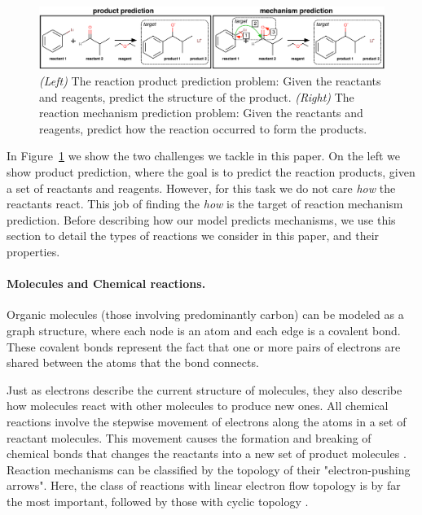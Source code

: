 

\begin{figure}[t!]
\centering
\includegraphics[width=\textwidth]{reaction_diagram.pdf}
\caption{\emph{(Left)} The reaction product prediction problem: Given the reactants and reagents, predict the structure of the product. \emph{(Right)} The reaction mechanism prediction problem: Given the reactants and reagents, predict how the reaction occurred to form the products.}
\label{fig:task-overview}

\end{figure}


In Figure~\ref{fig:task-overview} we show the two challenges we tackle in this paper. 
On the left we show product prediction, where the goal is to predict the reaction products, given a set of reactants and reagents. However, for this task we do not care {\em how} the reactants react.
 This job of finding the {\em how} is the target of reaction mechanism prediction. 
 Before describing how our model predicts mechanisms, we use this section to detail the types of reactions we consider in this paper, and their properties.



\vspace{-0.15cm}
\paragraph{Molecules and Chemical reactions.}


Organic molecules (those involving predominantly carbon) can be modeled as a graph structure, where each node is an atom and each edge is a covalent bond.
These covalent bonds represent the fact that 
one or more pairs of electrons are shared between the atoms that the bond connects. 


Just as electrons describe the current structure of molecules, 
they also describe how molecules react with other molecules to produce new ones. All chemical reactions involve the stepwise movement of electrons along the atoms in a set of reactant molecules. 
This movement causes the formation and breaking of chemical bonds that changes the reactants into a new set of product molecules \citep{herges1994coarctate}. 
%
Reaction mechanisms can be classified by the topology of their "electron-pushing arrows". Here, the class of reactions with linear electron flow topology is by far the most important, followed by those with cyclic topology \citep{herges1994coarctate}.

